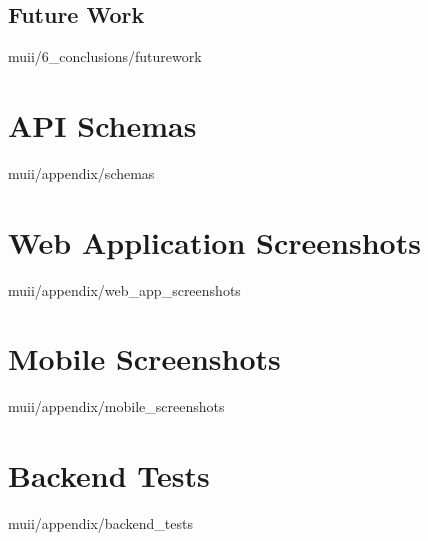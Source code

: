 \documentclass[english,epsbased,copyright,final,printable,covers,extendedindex,firstnumbered,tfm,gnuplot,loc,lof,lot]{tfgtfmthesisuam}
\begin{document}
    \section{Future Work\label{SEC:FUTUREWORK}}{muii/6_conclusions/futurework}

  \appendix
  \chapter{API Schemas\label{AP:SCHEMAS}}{muii/appendix/schemas}
  \chapter{Web Application Screenshots\label{AP:WEB_APP_SCREENSHOTS}}{muii/appendix/web_app_screenshots}
  \chapter{Mobile Screenshots\label{AP:MOBILE_SCREENSHOTS}}{muii/appendix/mobile_screenshots}
  \chapter{Backend Tests\label{AP:BACKEND_TESTS}}{muii/appendix/backend_tests}
\end{document}
